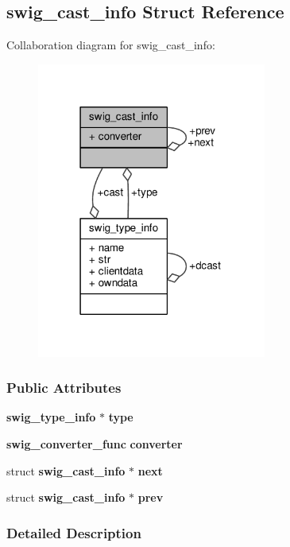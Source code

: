 \subsection{swig\+\_\+cast\+\_\+info Struct Reference}
\label{structswig__cast__info}


Collaboration diagram for swig\+\_\+cast\+\_\+info\+:
\nopagebreak
\begin{figure}[H]
\begin{center}
\leavevmode
\includegraphics[width=214pt]{d6/d7c/structswig__cast__info__coll__graph}
\end{center}
\end{figure}
\subsubsection*{Public Attributes}
\begin{DoxyCompactItemize}
\item 
{\bf swig\+\_\+type\+\_\+info} $\ast$ {\bf type}
\item 
{\bf swig\+\_\+converter\+\_\+func} {\bf converter}
\item 
struct {\bf swig\+\_\+cast\+\_\+info} $\ast$ {\bf next}
\item 
struct {\bf swig\+\_\+cast\+\_\+info} $\ast$ {\bf prev}
\end{DoxyCompactItemize}


\subsubsection{Detailed Description}


